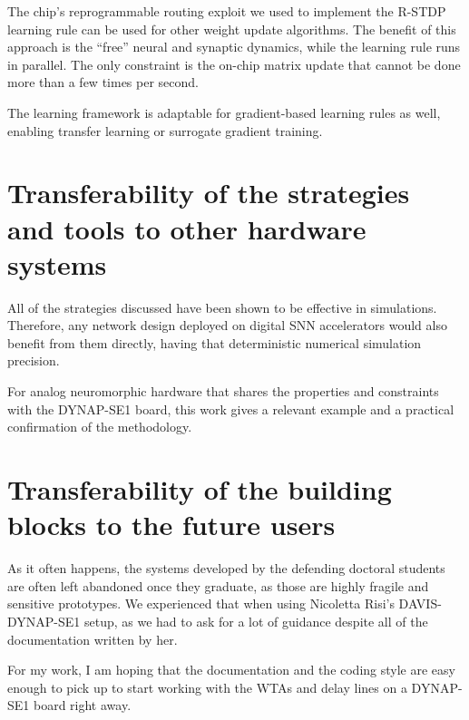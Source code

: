 The chip's reprogrammable routing exploit we used to implement the R-STDP learning rule can be used for other weight update algorithms. The benefit of this approach is the ``free'' neural and synaptic dynamics, while the learning rule runs in parallel. The only constraint is the on-chip matrix update that cannot be done more than a few times per second.

The learning framework is adaptable for gradient-based learning rules as well, enabling transfer learning or surrogate gradient training.


\section{Transferability of the strategies and tools to other hardware systems}

All of the strategies discussed have been shown to be effective in simulations. Therefore, any network design deployed on digital SNN accelerators would also benefit from them directly, having that deterministic numerical simulation precision.

For analog neuromorphic hardware that shares the properties and constraints with the DYNAP-SE1 board, this work gives a relevant example and a practical confirmation of the methodology.





\section{Transferability of the building blocks to the future users}

As it often happens, the systems developed by the defending doctoral students are often left abandoned once they graduate, as those are highly fragile and sensitive prototypes. We experienced that when using Nicoletta Risi's DAVIS-DYNAP-SE1 setup, as we had to ask for a lot of guidance despite all of the documentation written by her.

For my work, I am hoping that the documentation and the coding style are easy enough to pick up to start working with the WTAs and delay lines on a DYNAP-SE1 board right away.




